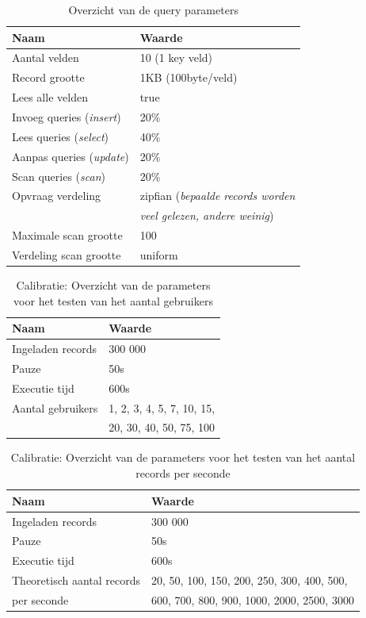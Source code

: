 \begin{table}[htb!]
	\centering
	\begin{tabular}{l| l }
	\textbf{Naam} & \textbf{Waarde} \\
	\hline
	Aantal velden & 10 (1 key veld) \\
	Record grootte & 1KB (100byte/veld) \\
	Lees alle velden & true \\
	Invoeg queries (\textit{insert}) & 20\%\\
	Lees queries (\textit{select}) & 40\%\\
	Aanpas queries (\textit{update}) & 20\%\\
	Scan queries (\textit{scan}) & 20\%\\
	Opvraag verdeling & zipfian (\textit{bepaalde records worden} \\
	& \textit{veel gelezen, andere weinig}) \\
	Maximale scan grootte & 100 \\
	Verdeling scan grootte & uniform \\
	\end{tabular}
	\caption{Overzicht van de query parameters}
	\label{table:calibratiequeries}
\end{table}

\begin{table}[htb!]
	\centering
	\begin{tabular}{l| l}
	\textbf{Naam} & \textbf{Waarde}  \\
	\hline
	Ingeladen records  & 300 000 \\
	Pauze & 50s \\
	Executie tijd & 600s \\
	Aantal gebruikers & 1, 2, 3, 4, 5, 7, 10, 15, \\
	& 20, 30, 40, 50, 75, 100\\
	\end{tabular}
	\caption{Calibratie: Overzicht van de parameters voor het testen van het aantal gebruikers}
	\label{table:calibratiegebruikers}
\end{table}

\begin{table}[htb!]
	\centering
	\begin{tabular}{l| l  }
		\textbf{Naam} & \textbf{Waarde}  \\
		\hline
		Ingeladen records  & 300 000  \\
		Pauze & 50s  \\
		Executie tijd & 600s \\
		Theoretisch aantal records & 20, 50, 100, 150, 200, 250, 300, 400, 500, \\
		per seconde  & 600, 700, 800,  900, 1000, 2000, 2500, 3000\\
	\end{tabular}
	\caption{Calibratie: Overzicht van de parameters voor het testen van het aantal records per seconde}
	\label{table:calibratiequeriesperseconde}
\end{table}

